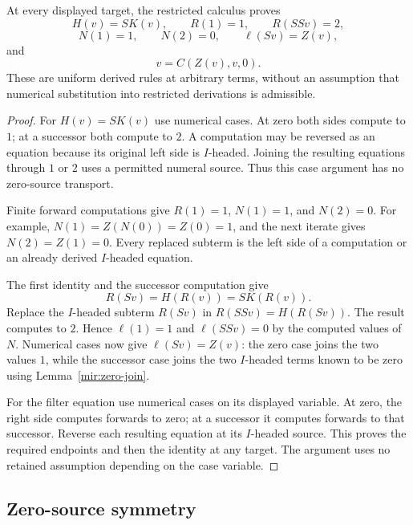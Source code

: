 \begin{lemma}
\label{compat:zero-tests}
At every displayed target, the restricted calculus proves
\[
 H(v)=S K(v),\qquad R(1)=1,\qquad R(SSv)=2,
\]
\[
 N(1)=1,\qquad N(2)=0,\qquad \ell(Sv)=Z(v),
\]
and
\[
                 v=C(Z(v),v,0).
                 \tag{Filter}\label{compat:filter}
\]
These are uniform derived rules at arbitrary terms, without an assumption
that numerical substitution into restricted derivations is admissible.
\end{lemma}
\begin{proof}
For $H(v)=S K(v)$ use numerical cases. At zero both sides compute to
$1$; at a successor both compute to $2$. A computation may be reversed
as an equation because its original left side is $I$-headed. Joining
the resulting equations through $1$ or $2$ uses a permitted numeral
source. Thus this case argument has no zero-source transport.

Finite forward computations give $R(1)=1$, $N(1)=1$, and $N(2)=0$.
For example, $N(1)=Z(N(0))=Z(0)=1$, and the next iterate gives
$N(2)=Z(1)=0$. Every replaced subterm is the left side of a computation
or an already derived $I$-headed equation.

The first identity and the successor computation give
\[
 R(Sv)=H(R(v))=S K(R(v)).
\]
Replace the $I$-headed subterm $R(Sv)$ in
$R(SSv)=H(R(Sv))$. The result computes to $2$.
Hence $\ell(1)=1$ and $\ell(SSv)=0$ by the computed values of $N$.
Numerical cases now give $\ell(Sv)=Z(v)$: the zero case joins the two
values $1$, while the successor case joins the two $I$-headed terms
known to be zero using Lemma~\ref{mir:zero-join}.

For the filter equation use numerical cases on its displayed variable.
At zero, the right side computes forwards to zero; at a successor it
computes forwards to that successor. Reverse each resulting equation
at its $I$-headed source. This proves the required endpoints and then
the identity at any target. The argument uses no retained assumption
depending on the case variable.
\end{proof}

\subsection{Zero-source symmetry}

